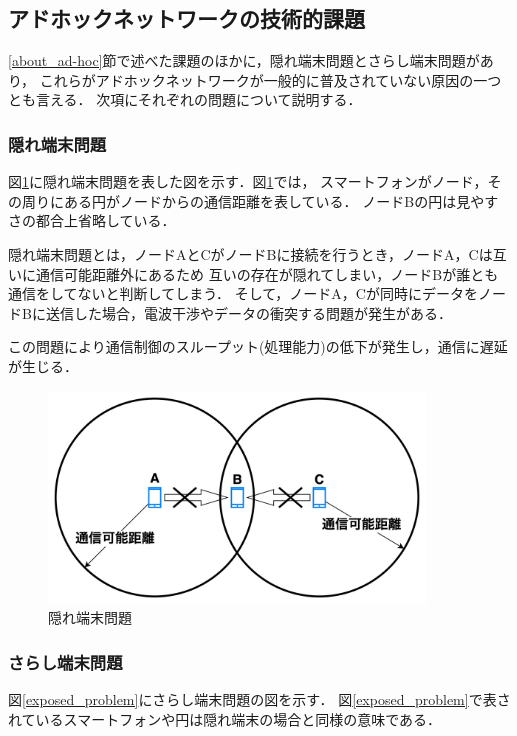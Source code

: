 \documentclass[a4paper, 11pt]{ltjsarticle}
\begin{document}
\clearpage
\subsection{アドホックネットワークの技術的課題}
\ref{about_ad-hoc}節で述べた課題のほかに，隠れ端末問題とさらし端末問題があり，
これらがアドホックネットワークが一般的に普及されていない原因の一つとも言える\cite{松井_進2012KJ00008330022}．
次項にそれぞれの問題について説明する．
\subsubsection{隠れ端末問題}
図\ref{hidden_problem}に隠れ端末問題を表した図を示す．図\ref{hidden_problem}では，
スマートフォンがノード，その周りにある円がノードからの通信距離を表している．
ノードBの円は見やすさの都合上省略している．

隠れ端末問題とは，ノードAとCがノードBに接続を行うとき，ノードA，Cは互いに通信可能距離外にあるため
互いの存在が隠れてしまい，ノードBが誰とも通信をしてないと判断してしまう．
そして，ノードA，Cが同時にデータをノードBに送信した場合，電波干渉やデータの衝突する問題が発生がある．

この問題により通信制御のスループット(処理能力)の低下が発生し，通信に遅延が生じる．
\begin{figure}[H]
  \centering
  \includegraphics[width=100mm]{hidden_terminal_problem.png}
  \caption{隠れ端末問題}
  \label{hidden_problem}
\end{figure}

\subsubsection{さらし端末問題}
図\ref{exposed_problem}にさらし端末問題の図を示す．
図\ref{exposed_problem}で表されているスマートフォンや円は隠れ端末の場合と同様の意味である．
\end{document}
